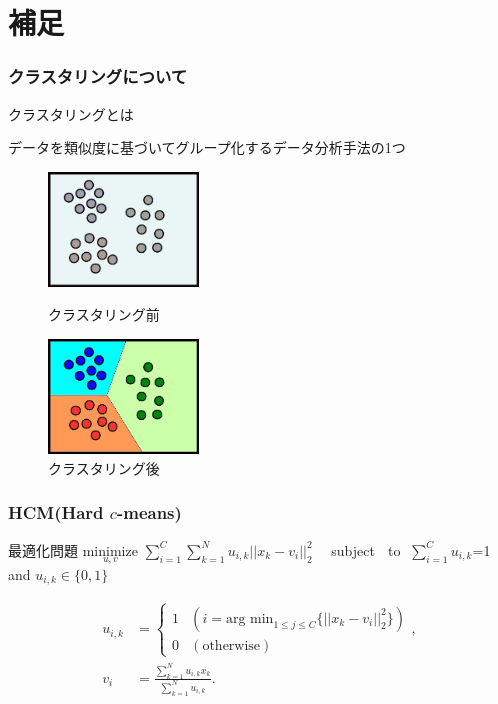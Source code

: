 \documentclass[13pt,dvipdfmx]{beamer}
\begin{document}
\section{補足}
\begin{frame}\frametitle{クラスタリングについて}
  \begin{block}{クラスタリングとは}
   \begin{center}
   データを類似度に基づいてグループ化するデータ分析手法の1つ
   \end{center}
  \end{block}
  \vspace{5mm}
  \begin{figure}[htbp]
    \begin{minipage}{0.4\hsize}
      \begin{center}
        \includegraphics[width=40mm]{before_clustering.png}
      \end{center}
      \captionsetup{labelformat=empty,labelsep=none}
      \caption{クラスタリング前}
      \label{fig:one}
    \end{minipage}
    \hspace{1cm}
    \begin{minipage}{0.4\hsize}
      \begin{center}
        \includegraphics[width=40mm]{after_clustering.png}
      \end{center}
      \captionsetup{labelformat=empty,labelsep=none}
      \caption{クラスタリング後}
      \label{fig:two}
    \end{minipage}
  \end{figure}
\end{frame}

\begin{frame}\frametitle{HCM\scriptsize(Hard $c$-means)}
  \begin{block}{最適化問題}
    $\underset{u,v}{\text{minimize}}$
    $\sum_{i=1}^C\sum_{k=1}^Nu_{i,k}||x_k-v_i||_2^2\quad$ subject
    $\;$ to $\; \sum_{i=1}^Cu_{i,k}$=1 \;and\; $u_{i,k}\in\{0,1\}$
  \end{block}
  \begin{align*}
    u_{i,k}&=\begin{cases}
    1 & (i=\text{arg min}_{1 \leq j \leq C}\{||x_k-v_i||_2^2\}) \\
    0 & (\text{otherwise})
    \end{cases},\\
    v_{i}&=
    \frac{\sum_{k=1}^N u_{i,k}x_{k}}{\sum_{k=1}^N u_{i,k}}.
  \end{align*}
\end{frame}
\end{document}
